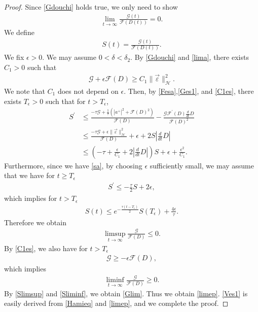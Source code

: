 \documentclass[reqno]{amsart}
\theoremstyle{plain}
\theoremstyle{definition}
\numberwithin{equation}{section}
\newcommand{\1}{\mathbbm{1}}
\begin{document}
\begin{proof}
Since \eqref{Gdouchi} holds true, we only need to show
\begin{align}\label{Glim}
\lim_{t\to\infty} \frac{\mathcal{G}(t)}{\mathcal{F}(D(t))}=0.
\end{align}
We define 
\begin{align*}
S(t)=\frac{\mathcal{G}(t)}{\mathcal{F}(D(t))}.
\end{align*}
We fix $\epsilon>0$. We may assume $0<\delta<\delta_2$. By \eqref{Gdouchi} and \eqref{lima}, there exists $C_1>0$ such that 
\begin{align}\label{C1es}
\mathcal{G}+\epsilon\mathcal{F}(D)\geq C_1\|\vec{\varepsilon}\|_{\mathcal{H}}^2.
\end{align}
We note that $C_1$ does not depend on $\epsilon$. Then, by \eqref{Fesa},\eqref{Ges1}, and \eqref{C1es}, there exists $T_{\epsilon}>0$  such that for $t>T_{\epsilon}$, 
\begin{align*}
S^{\prime}&\leq \frac{ -\tau \mathcal{G}+\frac{1}{\tau}\left(|a^+|^2+\mathcal{F}(D)^2\right)}{\mathcal{F}(D)}-\frac{\mathcal{G}\mathcal{F}^{\prime}(D)\frac{d}{dt}D}{\mathcal{F}(D)^2}
\\
&\leq \frac{-\tau \mathcal{G}+\epsilon\|\vec{\varepsilon}\|_{\mathcal{H}}^2}{\mathcal{F}(D)}+\epsilon+2S\left| \frac{d}{dt}D\right|
\\
&\leq \left(-\tau+\frac{\epsilon}{C_1}+2\left|\frac{d}{dt}D\right|\right)S+\epsilon+\frac{\epsilon^2}{C_1}.
\end{align*}
Furthermore, since we have \eqref{sa}, by choosing $\epsilon$ sufficiently small, we may assume that we have for $t\geq T_{\epsilon}$
\begin{align*}
S^{\prime}\leq -\frac{\tau}{2}S+2\epsilon,
\end{align*}
which implies for $t>T_{\epsilon}$
\begin{align*}
S(t)\leq e^{-\frac{\tau(t-T_{\epsilon})}{2}}S(T_{\epsilon})+\frac{4\epsilon}{\tau}.
\end{align*}
Therefore we obtain
\begin{align}\label{Slimsup}
\limsup_{t\to\infty}\frac{ \mathcal{G}}{\mathcal{F}(D)}\leq 0.
\end{align}
By \eqref{C1es}, we also have for $t>T_{\epsilon}$
\begin{align*}
\mathcal{G}\geq -\epsilon\mathcal{F}(D),
\end{align*}
which implies
\begin{align}\label{Sliminf}
\liminf_{t\to\infty}\frac{ \mathcal{G}}{\mathcal{F}(D)}\geq 0.
\end{align}
By \eqref{Slimsup} and \eqref{Sliminf}, we obtain \eqref{Glim}. Thus we obtain \eqref{limep}. \eqref{Ves1} is easily derived from \eqref{Hamieq} and \eqref{limep}, and we complete the proof.




\end{proof}
\end{document}
